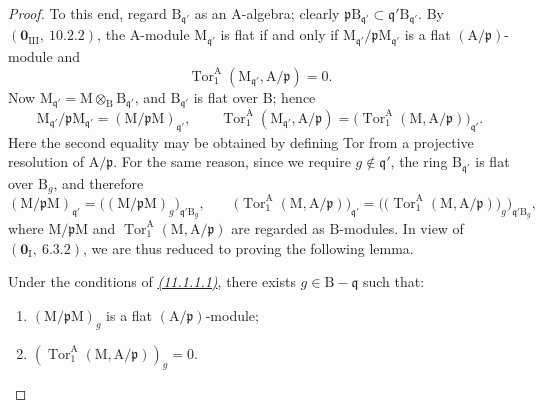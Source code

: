 \begin{proof}
To this end, regard $\mathrm{B}_{\mathfrak{q}'}$ as an $\mathrm{A}$-algebra; clearly
$\mathfrak{p}\mathrm{B}_{\mathfrak{q}'}\subset
\mathfrak{q}'\mathrm{B}_{\mathfrak{q}'}$. By
$(\mathbf{0}_{\mathrm{III}},~10.2.2)$, the $\mathrm{A}$-module
$\mathrm{M}_{\mathfrak{q}'}$ is flat if and only if
$\mathrm{M}_{\mathfrak{q}'}/\mathfrak{p}\mathrm{M}_{\mathfrak{q}'}$ is a
flat $(\mathrm{A}/\mathfrak{p})$-module and
\[
  \operatorname{Tor}_1^\mathrm{A}
  (\mathrm{M}_{\mathfrak{q}'},\mathrm{A}/\mathfrak{p})=0.
\]
Now $\mathrm{M}_{\mathfrak{q}'}=
\mathrm{M}\otimes_{\mathrm{B}}\mathrm{B}_{\mathfrak{q}'}$, and
$\mathrm{B}_{\mathfrak{q}'}$ is flat over $\mathrm{B}$; hence
\[
  \mathrm{M}_{\mathfrak{q}'}/\mathfrak{p}\mathrm{M}_{\mathfrak{q}'}
    =(\mathrm{M}/\mathfrak{p}\mathrm{M})_{\mathfrak{q}'},
  \qquad
  \operatorname{Tor}_1^\mathrm{A}
  (\mathrm{M}_{\mathfrak{q}'},\mathrm{A}/\mathfrak{p})
    =\bigl(\operatorname{Tor}_1^\mathrm{A}
      (\mathrm{M},\mathrm{A}/\mathfrak{p})\bigr)_{\mathfrak{q}'}.
\]
Here the second equality may be obtained by defining Tor from a projective
resolution of $\mathrm{A}/\mathfrak{p}$. For the same reason, since we require
$g\notin\mathfrak{q}'$, the ring $\mathrm{B}_{\mathfrak{q}'}$ is flat over
$\mathrm{B}_g$, and therefore
\[
  (\mathrm{M}/\mathfrak{p}\mathrm{M})_{\mathfrak{q}'}
    =\bigl((\mathrm{M}/\mathfrak{p}\mathrm{M})_g
      \bigr)_{\mathfrak{q}'\mathrm{B}_g},
  \qquad
  \bigl(\operatorname{Tor}_1^\mathrm{A}
      (\mathrm{M},\mathrm{A}/\mathfrak{p})\bigr)_{\mathfrak{q}'}
    =\bigl(\bigl(\operatorname{Tor}_1^\mathrm{A}
      (\mathrm{M},\mathrm{A}/\mathfrak{p})\bigr)_g
      \bigr)_{\mathfrak{q}'\mathrm{B}_g},
\]
where $\mathrm{M}/\mathfrak{p}\mathrm{M}$ and
$\operatorname{Tor}_1^\mathrm{A}
(\mathrm{M},\mathrm{A}/\mathfrak{p})$ are regarded as
$\mathrm{B}$-modules. In view of $(\mathbf{0}_\mathrm{I},~6.3.2)$, we are
thus reduced to proving the following lemma.

\begin{lemma}[11.1.1.2]
\label{IV.11.1.1.2}
Under the conditions of \emph{{\hyperref[IV.11.1.1.1]{(11.1.1.1)}}}, there exists $g\in\mathrm{B}-\mathfrak{q}$ such that:
\begin{enumerate}[label=\emph{\roman*)}]
  \item $(\mathrm{M}/\mathfrak{p}\mathrm{M})_g$ is a flat $(\mathrm{A}/\mathfrak{p})$-module;
  \item $(\operatorname{Tor}_1^\mathrm{A}(\mathrm{M},\mathrm{A}/\mathfrak{p}))_g=0$.
\end{enumerate}
\end{lemma}


\end{proof}
